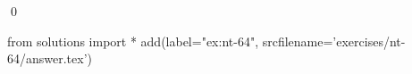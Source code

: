 
\begin{ex} 
  \label{ex:nt-64}
  
  \qed
\end{ex} 
\begin{python0}
from solutions import *
add(label="ex:nt-64",
    srcfilename='exercises/nt-64/answer.tex') 
\end{python0}
